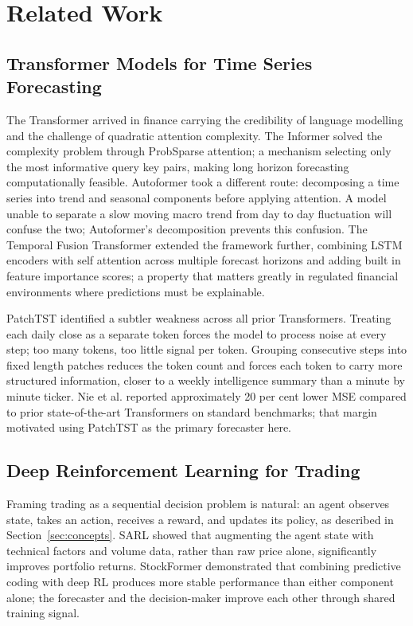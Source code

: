 \documentclass[journal]{IEEEtran}
\begin{document}
\section{Related Work}
\label{sec:related}

\subsection{Transformer Models for Time Series Forecasting}

The Transformer arrived in finance carrying the credibility of language
modelling and the challenge of quadratic attention complexity. The
Informer \cite{informer} solved the complexity problem through ProbSparse
attention; a mechanism selecting only the most informative query key
pairs, making long horizon forecasting computationally feasible. Autoformer
\cite{autoformer} took a different route: decomposing a time series into
trend and seasonal components before applying attention. A model unable to
separate a slow moving macro trend from day to day fluctuation will
confuse the two; Autoformer's decomposition prevents this confusion. The
Temporal Fusion Transformer \cite{tft} extended the framework further,
combining LSTM encoders with self attention across multiple forecast
horizons and adding built in feature importance scores; a property that
matters greatly in regulated financial environments where predictions must
be explainable.

PatchTST \cite{patchtst} identified a subtler weakness across all prior
Transformers. Treating each daily close as a separate token forces the
model to process noise at every step; too many tokens, too little signal
per token. Grouping consecutive steps into fixed length patches reduces
the token count and forces each token to carry more structured
information, closer to a weekly intelligence summary than a minute by
minute ticker. Nie et al. reported approximately 20 per cent lower MSE
compared to prior state-of-the-art Transformers on standard benchmarks;
that margin motivated using PatchTST as the primary forecaster here.

\subsection{Deep Reinforcement Learning for Trading}

Framing trading as a sequential decision problem is natural: an agent
observes state, takes an action, receives a reward, and updates its
policy, as described in Section~\ref{sec:concepts}. SARL \cite{sarl}
showed that augmenting the agent state with technical factors and volume
data, rather than raw price alone, significantly improves portfolio
returns. StockFormer \cite{stockformer} demonstrated that combining
predictive coding with deep RL produces more stable performance than
either component alone; the forecaster and the decision-maker improve
each other through shared training signal.
\end{document}
